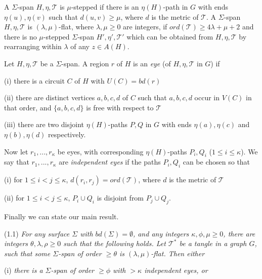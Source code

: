 A $\Sigma$-span $H, \eta, \mathscr{T}$ is $\mu$-stepped if there is an $\eta(H)$-path in $G$ with ends $\eta(u), \eta(v)$ such that $d(u, v) \ge \mu$, where $d$ is the metric of $\mathscr{T}$. A $\Sigma$-span $H, \eta, \mathscr{T}$ is $(\lambda, \mu)$-flat, where $\lambda, \mu \ge 0$ are integers, if $ord(\mathscr{T}) \ge 4\lambda + \mu + 2$ and there is no $\mu$-stepped $\Sigma$-span $H', \eta', \mathscr{T}'$ which can be obtained from $H, \eta, \mathscr{T}$ by rearranging within $\lambda$ of any $z \in A(H)$.

Let $H, \eta, \mathscr{T}$ be a $\Sigma$-span. A region $r$ of $H$ is an \textit{eye} (of $H, \eta, \mathscr{T}$ in $G$) if

\hspace*{12pt}(i) there is a circuit $C$ of $H$ with $U(C) = bd(r)$

\hspace*{12pt}(ii) there are distinct vertices $a, b, c, d$ of $C$ such that $a, b, c, d$ occur in $V(C)$ in that order, and $\{a, b, c, d\}$ is free with respect to $\mathscr{T}$

\hspace*{12pt}(iii) there are two disjoint $\eta(H)$-paths $P, Q$ in $G$ with ends $\eta(a), \eta(c)$ and $\eta(b), \eta(d)$ respectively.

Now let $r_1, ..., r_\kappa$ be eyes, with corresponding $\eta(H)$-paths $P_i, Q_i$ ($1 \le i \le \kappa$). We say that $r_1, ..., r_\kappa$ are \textit{independent eyes} if the paths $P_i, Q_i$ can be chosen so that

\hspace*{12pt}(i) for $1 \le i < j \le \kappa$, $d(r_i, r_j) = ord(\mathscr{T})$, where $d$ is the metric of $\mathscr{T}$

\hspace*{12pt}(ii) for $1 \le i < j \le \kappa$, $P_i \cup Q_i$ is disjoint from $P_j \cup Q_j$.

Finally we can state our main result.

\stmt
(1.1) \textit{For any surface $\Sigma$ with $bd(\Sigma) = \emptyset$, and any integers $\kappa, \phi, \mu \ge 0$, there are integers $\theta, \lambda, \rho \ge 0$ such that the following holds. Let $\mathscr{T}^*$ be a tangle in a graph $G$, such that some $\Sigma$-span of order $\ge \theta$ is $(\lambda, \mu)$-flat. Then either}

\hspace*{12pt}(i) \textit{there is a $\Sigma$-span of order $\ge \phi$ with $> \kappa$ independent eyes, or}

